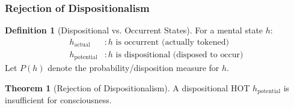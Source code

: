 \documentclass[11pt,a4paper]{article}
\theoremstyle{definition}
\newtheorem{definition}{Definition}[section]
\newtheorem{theorem}{Theorem}[section]
\theoremstyle{remark}
\begin{document}
\subsubsection{Rejection of Dispositionalism}

\begin{definition}[Dispositional vs. Occurrent States]
\label{def:disposition}
For a mental state $h$:
\begin{align}
h_{\text{actual}} &: h \text{ is occurrent (actually tokened)} \\
h_{\text{potential}} &: h \text{ is dispositional (disposed to occur)}
\end{align}
Let $P(h)$ denote the probability/disposition measure for $h$.
\end{definition}

\begin{theorem}[Rejection of Dispositionalism]
\label{thm:reject-disp}
A dispositional HOT $h_{\text{potential}}$ is insufficient for consciousness.
\end{theorem}
\end{document}
